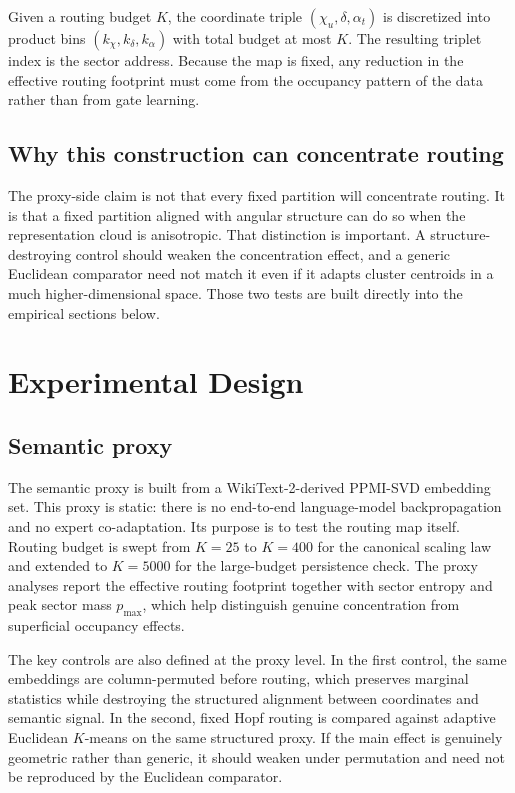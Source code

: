 \documentclass[11pt,letterpaper]{article}
\begin{document}
Given a routing budget $K$, the coordinate triple $(\chi_u,\delta,\alpha_t)$ is discretized into product bins $(k_\chi,k_\delta,k_\alpha)$ with total budget at most $K$. The resulting triplet index is the sector address. Because the map is fixed, any reduction in the effective routing footprint must come from the occupancy pattern of the data rather than from gate learning.

\subsection{Why this construction can concentrate routing}
The proxy-side claim is not that every fixed partition will concentrate routing. It is that a fixed partition aligned with angular structure can do so when the representation cloud is anisotropic. That distinction is important. A structure-destroying control should weaken the concentration effect, and a generic Euclidean comparator need not match it even if it adapts cluster centroids in a much higher-dimensional space. Those two tests are built directly into the empirical sections below.

\section{Experimental Design}
\subsection{Semantic proxy}
The semantic proxy is built from a WikiText-2-derived PPMI-SVD embedding set. This proxy is static: there is no end-to-end language-model backpropagation and no expert co-adaptation. Its purpose is to test the routing map itself. Routing budget is swept from $K=25$ to $K=400$ for the canonical scaling law and extended to $K=5000$ for the large-budget persistence check. The proxy analyses report the effective routing footprint together with sector entropy and peak sector mass $p_{\max}$, which help distinguish genuine concentration from superficial occupancy effects.

The key controls are also defined at the proxy level. In the first control, the same embeddings are column-permuted before routing, which preserves marginal statistics while destroying the structured alignment between coordinates and semantic signal. In the second, fixed Hopf routing is compared against adaptive Euclidean $K$-means on the same structured proxy. If the main effect is genuinely geometric rather than generic, it should weaken under permutation and need not be reproduced by the Euclidean comparator.
\end{document}
